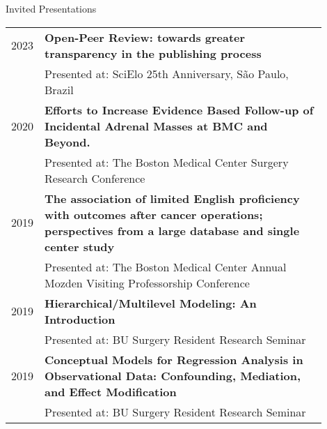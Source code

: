 \documentclass{resume} %
\begin{document}
\begin{rSection}{Invited Presentations}
   \begin{tabular}{lp{0.90\linewidth}}
    2023 & \textbf{Open-Peer Review: towards greater transparency in the publishing process}\\
    & Presented at: SciElo 25th Anniversary, São Paulo, Brazil\\
   
   2020 & \textbf{Efforts to Increase Evidence Based Follow-up of Incidental Adrenal Masses at BMC and Beyond.}\\
   & Presented at: The Boston Medical Center Surgery Research Conference\\

   2019 & \textbf{The association of limited English proficiency with outcomes after cancer operations; perspectives from a large database and single center study}\\
   & Presented at: The Boston Medical Center Annual Mozden Visiting Professorship Conference\\

   2019 & \textbf{Hierarchical/Multilevel Modeling: An Introduction}\\
   & Presented at: BU Surgery Resident Research Seminar\\

   2019 & \textbf{Conceptual Models for Regression Analysis in Observational Data: Confounding, Mediation, and Effect Modification}\\
   & Presented at: BU Surgery Resident Research Seminar

   \end{tabular}

   \end{rSection}
\end{document}
